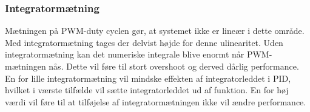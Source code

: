 \subsubsection{Integratormætning}
Mætningen på PWM-duty cyclen gør, at systemet ikke er lineær i dette område. Med integratormætning 
tages der delvist højde for denne ulinearitet. Uden integratormætning kan det numeriske integrale blive enormt når 
PWM-mætningen nås. Dette vil føre til stort overshoot og derved dårlig 
performance. 
En for lille integratormætning vil mindske effekten af integratorleddet i PID, 
hvilket i værste tilfælde vil sætte integratorleddet ud af funktion.
En for høj værdi vil føre til at tilføjelse af integratormætningen ikke vil ændre 
performance.



